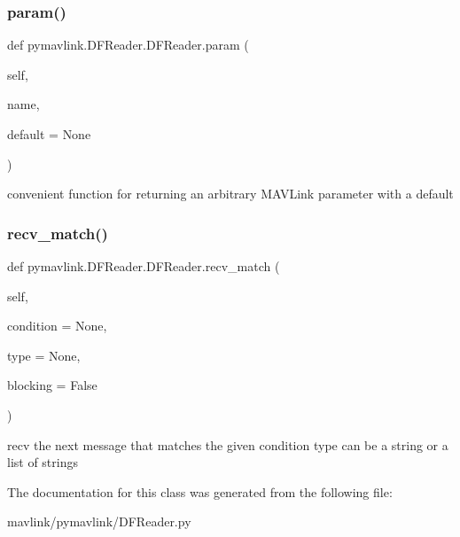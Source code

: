 \subsubsection{\texorpdfstring{param()}{param()}}
{\footnotesize\ttfamily def pymavlink.\+D\+F\+Reader.\+D\+F\+Reader.\+param (\begin{DoxyParamCaption}\item[{}]{self,  }\item[{}]{name,  }\item[{}]{default = {\ttfamily None} }\end{DoxyParamCaption})}

\begin{DoxyVerb}convenient function for returning an arbitrary MAVLink
   parameter with a default\end{DoxyVerb}
 \mbox{\label{classpymavlink_1_1DFReader_1_1DFReader_aa0900449adff0ff0946cc568f83308ed}} 
\subsubsection{\texorpdfstring{recv\+\_\+match()}{recv\_match()}}
{\footnotesize\ttfamily def pymavlink.\+D\+F\+Reader.\+D\+F\+Reader.\+recv\+\_\+match (\begin{DoxyParamCaption}\item[{}]{self,  }\item[{}]{condition = {\ttfamily None},  }\item[{}]{type = {\ttfamily None},  }\item[{}]{blocking = {\ttfamily False} }\end{DoxyParamCaption})}

\begin{DoxyVerb}recv the next message that matches the given condition
type can be a string or a list of strings\end{DoxyVerb}
 

The documentation for this class was generated from the following file\+:\begin{DoxyCompactItemize}
\item 
mavlink/pymavlink/D\+F\+Reader.\+py\end{DoxyCompactItemize}

